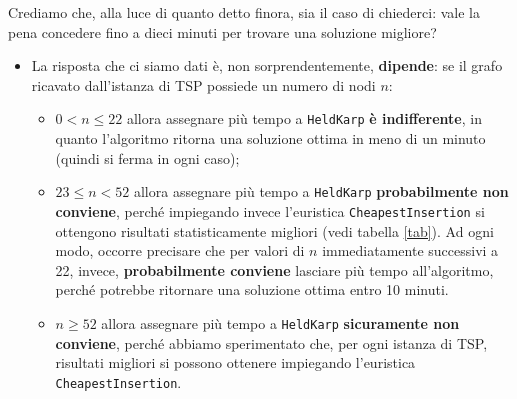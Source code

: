 Crediamo che, alla luce di quanto detto finora, sia il caso di chiederci: vale la pena concedere fino a dieci minuti per trovare una soluzione migliore?
\begin{itemize}
	\item La risposta che ci siamo dati è, non sorprendentemente, \textbf{dipende}: se il grafo ricavato dall'istanza di TSP possiede un numero di nodi $n$:
	\begin{itemize}
		\item $0< n \leq 22 $ allora assegnare più tempo a \texttt{HeldKarp} \textbf{è indifferente}, in quanto l'algoritmo ritorna una soluzione ottima in meno di un minuto (quindi si ferma in ogni caso);
		\item $23 \leq n < 52$ allora assegnare più tempo a \texttt{HeldKarp}\textbf{ probabilmente non conviene}, perché impiegando invece l'euristica \texttt{CheapestInsertion} si ottengono risultati statisticamente migliori (vedi tabella \ref{tab}). Ad ogni modo, occorre precisare che per valori di $n$ immediatamente successivi a 22, invece, \textbf{probabilmente conviene} lasciare più tempo all'algoritmo, perché potrebbe ritornare una soluzione ottima entro 10 minuti.
		\item $ n\geq 52$ allora assegnare più tempo a \texttt{HeldKarp} \textbf{sicuramente non conviene}, perché abbiamo sperimentato che, per ogni istanza di TSP, risultati migliori si possono ottenere impiegando l'euristica \texttt{CheapestInsertion}.
	\end{itemize}
\end{itemize}
